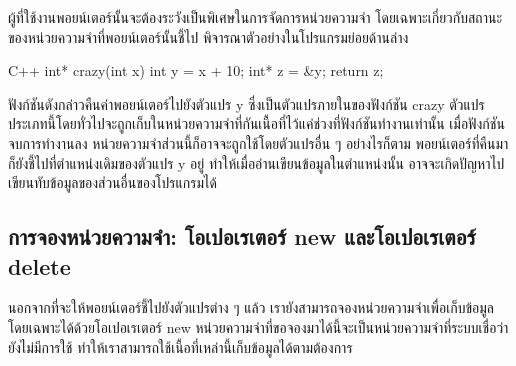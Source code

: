 ผู้{\wbr}ที่{\wbr}ใช้งาน{\wbr}พอยน์เตอร์{\wbr}นั้น{\wbr}จะ{\wbr}ต้อง{\wbr}ระวัง{\wbr}เป็น{\wbr}พิเศษ{\wbr}ใน{\wbr}การ{\wbr}จัดการ{\wbr}หน่วย{\wbr}ความ{\wbr}จำ{\wbr}
โดย{\wbr}เฉพาะ{\wbr}เกี่ยว{\wbr}กับ{\wbr}สถานะ{\wbr}ของ{\wbr}หน่วย{\wbr}ความ{\wbr}จำ{\wbr}ที่{\wbr}พอยน์เตอร์{\wbr}นั้น{\wbr}ชี้{\wbr}ไป{\wbr}
พิจารณา{\wbr}ตัวอย่าง{\wbr}ใน{\wbr}โปรแกรม{\wbr}ย่อย{\wbr}ด้าน{\wbr}ล่าง{\wbr}

\latintext
\begin{codelist}{C++}{}
int* crazy(int x)
{
  int y = x + 10;  int* z = &y;
  return z;
}
\end{codelist}
\thaitext

ฟังก์ชัน{\wbr}ดัง{\wbr}กล่าว{\wbr}คืน{\wbr}ค่า{\wbr}พอยน์เตอร์{\wbr}ไป{\wbr}ยัง{\wbr}ตัวแปร {\ct y} ซึ่ง{\wbr}เป็น{\wbr}ตัวแปร{\wbr}ภายใน{\wbr}ของ{\wbr}ฟังก์ชัน {\ct
  crazy}
ตัวแปร{\wbr}ประเภท{\wbr}นี้{\wbr}โดย{\wbr}ทั่วไป{\wbr}จะ{\wbr}ถูก{\wbr}เก็บ{\wbr}ใน{\wbr}หน่วย{\wbr}ความ{\wbr}จำ{\wbr}ที่{\wbr}กัน{\wbr}เนื้อที่{\wbr}ไว้{\wbr}แค่{\wbr}ช่วง{\wbr}ที่{\wbr}ฟังก์ชัน{\wbr}ทำงาน{\wbr}เท่านั้น{\wbr}
เมื่อ{\wbr}ฟังก์ชัน{\wbr}จบ{\wbr}การ{\wbr}ทำงาน{\wbr}ลง หน่วย{\wbr}ความ{\wbr}จำ{\wbr}ส่วน{\wbr}นี้{\wbr}ก็{\wbr}อาจ{\wbr}จะ{\wbr}ถูก{\wbr}ใช้{\wbr}โดย{\wbr}ตัวแปร{\wbr}อื่น ๆ อย่างไร{\wbr}ก็{\wbr}ตาม{\wbr}
พอยน์เตอร์ที่{\wbr}คืน{\wbr}มา{\wbr}ก็{\wbr}ยัง{\wbr}ชี้{\wbr}ไป{\wbr}ที่{\wbr}ตำแหน่ง{\wbr}เดิม{\wbr}ของ{\wbr}ตัวแปร {\ct y} อยู่{\wbr}
ทำให้{\wbr}เมื่อ{\wbr}อ่าน{\wbr}เขียน{\wbr}ข้อมูล{\wbr}ใน{\wbr}ตำแหน่ง{\wbr}นั้น{\wbr}
อาจ{\wbr}จะ{\wbr}เกิด{\wbr}ปัญหา{\wbr}ไป{\wbr}เขียน{\wbr}ทับ{\wbr}ข้อมูล{\wbr}ของ{\wbr}ส่วน{\wbr}อื่น{\wbr}ของ{\wbr}โปรแกรม{\wbr}ได้{\wbr}

\subsection{การ{\wbr}จอง{\wbr}หน่วย{\wbr}ความ{\wbr}จำ: โอเปอเรเตอร์ {\ct new} และ{\wbr}โอเปอเรเตอร์ {\ct delete}}
นอกจาก{\wbr}ที่{\wbr}จะ{\wbr}ให้{\wbr}พอยน์เตอร์{\wbr}ชี้{\wbr}ไป{\wbr}ยัง{\wbr}ตัวแปร{\wbr}ต่าง ๆ แล้ว{\wbr}
เรา{\wbr}ยัง{\wbr}สามารถ{\wbr}จอง{\wbr}หน่วย{\wbr}ความ{\wbr}จำ{\wbr}เพื่อ{\wbr}เก็บ{\wbr}ข้อมูล{\wbr}โดย{\wbr}เฉพาะ{\wbr}ได้{\wbr}ด้วย{\wbr}โอเปอเรเตอร์ {\ct new}
หน่วย{\wbr}ความ{\wbr}จำ{\wbr}ที่{\wbr}ขอ{\wbr}จอง{\wbr}มา{\wbr}ได้{\wbr}นี้{\wbr}จะ{\wbr}เป็น{\wbr}หน่วย{\wbr}ความ{\wbr}จำ{\wbr}ที่{\wbr}ระบบ{\wbr}เชื่อ{\wbr}ว่า{\wbr}ยัง{\wbr}ไม่{\wbr}มี{\wbr}การ{\wbr}ใช้{\wbr}
ทำให้{\wbr}เรา{\wbr}สามารถ{\wbr}ใช้{\wbr}เนื้อที่{\wbr}เหล่า{\wbr}นี้{\wbr}เก็บ{\wbr}ข้อมูล{\wbr}ได้{\wbr}ตาม{\wbr}ต้องการ{\wbr}

